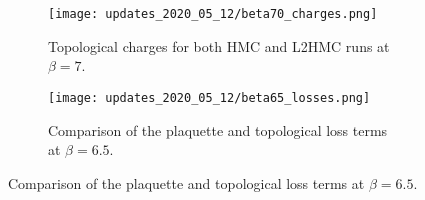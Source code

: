 %
\begin{figure}[htpb]
  \centering
  \begin{subfigure}[t]{0.8\textwidth}
    \texttt{[image: updates\_2020\_05\_12/beta70\_charges.png]}
    \caption{Topological charges for both HMC and L2HMC runs at \(\beta = 7\).}%
  \end{subfigure}
  \begin{subfigure}[t]{0.8\textwidth}
    \texttt{[image: updates\_2020\_05\_12/beta65\_losses.png]}
    \caption{Comparison of the plaquette and topological loss terms at \(\beta
    = 6.5\).}%
  \end{subfigure}
\end{figure}
